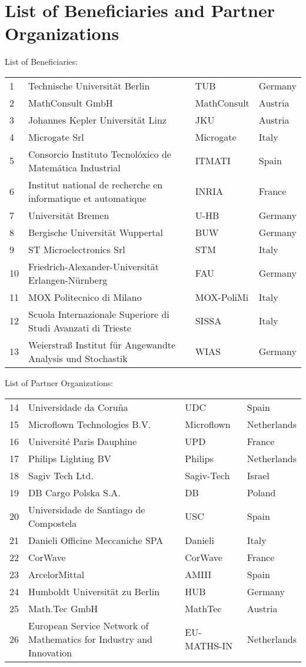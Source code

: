 \section*{List of Beneficiaries and Partner Organizations}
\label{sec:listBen}

List of Beneficiaries:
\vspace{0.2cm}

\begin{tabular}{lp{10cm}p{2.5cm}l}
 1&Technische Universit\"at Berlin&TUB &Germany\\
 2&MathConsult GmbH & MathConsult&Austria\\
 3&Johannes Kepler Universit\"at Linz& JKU&Austria\\
 4&Microgate Srl&Microgate&Italy\\
 5&Consorcio Instituto Tecnolóxico de Matemática Industrial&ITMATI&Spain\\
 6&Institut national de recherche en informatique et automatique&INRIA&France\\
 7&Universit\"at Bremen&U-HB&Germany\\
 8&Bergische Universit\"at Wuppertal&BUW&Germany\\
 9&ST Microelectronics Srl &STM&Italy\\
 10&Friedrich-Alexander-Universit\"at Erlangen-N\"urnberg&FAU&Germany\\
 11& MOX Politecnico di Milano&MOX-PoliMi&Italy\\
 12&Scuola Internazionale Superiore di Studi Avanzati di Trieste&SISSA&Italy\\
 13&Weierstra\ss{} Institut f\"ur Angewandte Analysis und Stochastik&WIAS&Germany
\end{tabular}
\vspace{1cm}

List of Partner Organizations:
\vspace{0.2cm}

\begin{tabular}{lp{10cm}p{2.5cm}l}
 14&Universidade da Coru\~{n}a&UDC&Spain\\
 15&Microflown Technologies B.V.& Microflown&Netherlands\\
 16&Université Paris Dauphine&UPD&France\\
 17&Philips Lighting BV&Philips&Netherlands\\
 18&Sagiv Tech Ltd.&Sagiv-Tech&Israel\\
 19&DB Cargo Polska S.A.& DB&Poland\\
 20&Universidade de Santiago de Compostela&USC&Spain\\
 21&Danieli Officine Meccaniche SPA&Danieli&Italy\\
 22&CorWave&CorWave&France\\
 23&ArcelorMittal&AMIII&Spain\\
 24&Humboldt Universit\"at zu Berlin&HUB&Germany\\
 25&Math.Tec GmbH&MathTec&Austria\\
 26&European Service Network of Mathematics for Industry and Innovation&EU-MATHS-IN&Netherlands
\end{tabular}